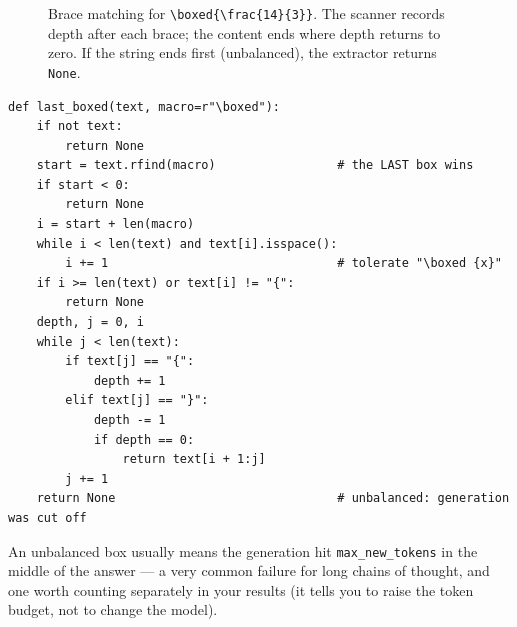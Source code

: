 \begin{figure}[t]
\centering
{}
\caption{Brace matching for \texttt{\textbackslash boxed\{\textbackslash frac\{14\}\{3\}\}}. The
scanner records depth after each brace; the content ends where depth returns to zero. If the
string ends first (unbalanced), the extractor returns \texttt{None}.}
\label{fig:eval:braces}
\end{figure}

\begin{lstlisting}[caption={Extracting the last boxed expression by brace matching.},label={lst:eval:lastboxed}]
def last_boxed(text, macro=r"\boxed"):
    if not text:
        return None
    start = text.rfind(macro)                 # the LAST box wins
    if start < 0:
        return None
    i = start + len(macro)
    while i < len(text) and text[i].isspace():
        i += 1                                # tolerate "\boxed {x}"
    if i >= len(text) or text[i] != "{":
        return None
    depth, j = 0, i
    while j < len(text):
        if text[j] == "{":
            depth += 1
        elif text[j] == "}":
            depth -= 1
            if depth == 0:
                return text[i + 1:j]
        j += 1
    return None                               # unbalanced: generation was cut off
\end{lstlisting}

An unbalanced box usually means the generation hit \texttt{max\_new\_tokens} in the middle of the
answer --- a very common failure for long chains of thought, and one worth counting separately in
your results (it tells you to raise the token budget, not to change the model).

